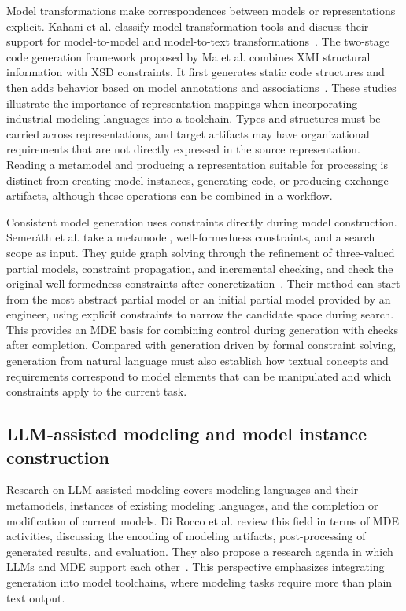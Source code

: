 \documentclass[pdflatex,iicol,sn-mathphys-num]{sn-jnl}
\newcommand{\paperref}[1]{~\citep{#1}}
\begin{document}
Model transformations make correspondences between models or representations explicit. Kahani et al. classify model transformation tools and discuss their support for model-to-model and model-to-text transformations\paperref{Kahani2019}. The two-stage code generation framework proposed by Ma et al. combines XMI structural information with XSD constraints. It first generates static code structures and then adds behavior based on model annotations and associations\paperref{Ma_2025a}. These studies illustrate the importance of representation mappings when incorporating industrial modeling languages into a toolchain. Types and structures must be carried across representations, and target artifacts may have organizational requirements that are not directly expressed in the source representation. Reading a metamodel and producing a representation suitable for processing is distinct from creating model instances, generating code, or producing exchange artifacts, although these operations can be combined in a workflow.

Consistent model generation uses constraints directly during model construction. Semer\'{a}th et al. take a metamodel, well-formedness constraints, and a search scope as input. They guide graph solving through the refinement of three-valued partial models, constraint propagation, and incremental checking, and check the original well-formedness constraints after concretization\paperref{Semer_th_2018}. Their method can start from the most abstract partial model or an initial partial model provided by an engineer, using explicit constraints to narrow the candidate space during search. This provides an MDE basis for combining control during generation with checks after completion. Compared with generation driven by formal constraint solving, generation from natural language must also establish how textual concepts and requirements correspond to model elements that can be manipulated and which constraints apply to the current task.

\subsection{LLM-assisted modeling and model instance construction}\label{sec:related-2-2}

Research on LLM-assisted modeling covers modeling languages and their metamodels, instances of existing modeling languages, and the completion or modification of current models. Di Rocco et al. review this field in terms of MDE activities, discussing the encoding of modeling artifacts, post-processing of generated results, and evaluation. They also propose a research agenda in which LLMs and MDE support each other\paperref{DiRocco2025}. This perspective emphasizes integrating generation into model toolchains, where modeling tasks require more than plain text output.
\end{document}
